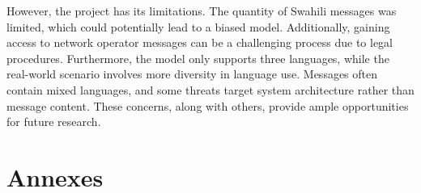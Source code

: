 \documentclass[12pt,a4paper, oneside]{book}
\begin{document}
However, the project has its limitations. The quantity of Swahili messages was limited, which could potentially lead to a biased model. Additionally, gaining access to network operator messages can be a challenging process due to legal procedures. Furthermore, the model only supports three languages, while the real-world scenario involves more diversity in language use. Messages often contain mixed languages, and some threats target system architecture rather than message content. These concerns, along with others, provide ample opportunities for future research.
 
 




\backmatter
\appendix


\chapter*{Annexes}
\end{document}
